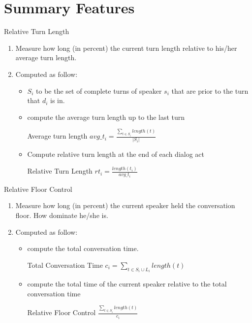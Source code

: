 \section{Summary Features}
\frame{\sectionpage}

\begin{frame}{Relative Turn Length}
\begin{enumerate}[<+->]\itemsep9pt
  \item Measure how long (in percent) the current turn length relative to his/her average turn length.
  \item {Computed as follow:
        \begin{itemize}
            \item $S_i$ to be the set of complete turns of speaker $s_i$ that are prior to the turn that $d_i$ is in.
            \item compute the average turn length up to the last turn
                \begin{block}{Average turn length }
                   $avg\_t_i = \frac{\sum_{t \in S_i} length(t)}{|S_i|}$
                \end{block}
            \item Compute relative turn length at the end of each dialog act
                \begin{block}{Relative Turn Length}
                     $rt_i =  \frac{length(t_i)} {avg\_t_i}$
                \end{block}
         \end{itemize}
        }
\end{enumerate}
\end{frame}


\begin{frame} {Relative Floor Control}
\begin{enumerate}
    \item Measure how long (in percent) the current speaker held the conversation floor. How dominate he/she is.
    \item Computed as follow:
         \begin{itemize}
              \item compute the total conversation time.
                 \begin{block} {Total Conversation Time}
                       $c_i = \sum_{t \in S_i \cup L_i} length(t)$
                 \end{block}
             \item  compute the total time of the current speaker relative to the total conversation time
                 \begin{block}{Relative Floor Control}
                     $\frac{\sum_{t \in S_i} length(t)} {c_i}$
                 \end{block}
         \end{itemize}
 \end{enumerate}
\end{frame}

